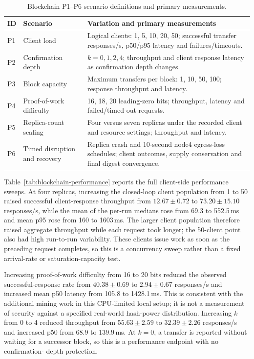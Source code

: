 \documentclass[sigconf,a4paper]{acmart}
\begin{document}
    \begin{table}[t]
        \centering
        \small
        \caption{Blockchain P1--P6 scenario definitions and primary measurements.}
        \label{tab:blockchain-p-scenarios}
        \begin{tabular}{p{0.9cm}p{4.1cm}p{9.7cm}}
            \toprule
            \textbf{ID} & \textbf{Scenario} & \textbf{Variation and primary measurements} \\
            \midrule
            P1 & Client load & Logical clients: 1, 5, 10, 20, 50; successful transfer responses/s, p50/p95 latency and failures/timeouts. \\
            P2 & Confirmation depth & $k=0,1,2,4$; throughput and client response latency as confirmation depth changes. \\
            P3 & Block capacity & Maximum transfers per block: 1, 10, 50, 100; response throughput and latency. \\
            P4 & Proof-of-work difficulty & 16, 18, 20 leading-zero bits; throughput, latency and failed/timed-out requests. \\
            P5 & Replica-count scaling & Four versus seven replicas under the recorded client and resource settings; throughput and latency. \\
            P6 & Timed disruption and recovery & Replica crash and 10-second node4 egress-loss schedules; client outcomes, supply conservation and final digest convergence. \\
            \bottomrule
        \end{tabular}
    \end{table}

    Table~\ref{tab:blockchain-performance} reports the full client-side
    performance sweeps. At four replicas, increasing the closed-loop client
    population from 1 to 50 raised successful client-response throughput from
    $12.67\pm0.72$ to $73.20\pm15.10$ responses/s, while the mean of the per-run
    medians rose from 69.3 to 552.5\,ms and mean p95 rose from 160 to 1603\,ms.
    The larger client population therefore raised aggregate throughput while
    each request took longer; the 50-client point also had high run-to-run
    variability. These clients issue work as soon as the preceding request
    completes, so this is a concurrency sweep rather than a fixed arrival-rate
    or saturation-capacity test.

    Increasing proof-of-work difficulty from 16 to 20 bits reduced the observed
    successful-response rate from $40.38\pm0.69$ to $2.94\pm0.67$ responses/s
    and increased mean p50 latency from 105.8 to 1428.1\,ms. This is consistent
    with the additional mining work in this CPU-limited local setup; it is not a
    measurement of security against a specified real-world hash-power
    distribution. Increasing $k$ from 0 to 4 reduced throughput from
    $55.63\pm2.59$ to $32.39\pm2.26$ responses/s and increased p50 from 68.9
    to 139.9\,ms. At $k=0$, a transfer is reported without waiting for a
    successor block, so this is a performance endpoint with no confirmation-
    depth protection.
\end{document}
